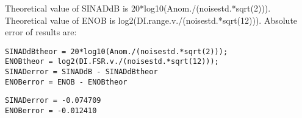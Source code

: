 Theoretical value of SINADdB is 20*log10(Anom./(noisestd.*sqrt(2))). Theoretical value of ENOB is
log2(DI.range.v./(noisestd.*sqrt(12))). Absolute error of results are:

\begin{lstlisting}
SINADdBtheor = 20*log10(Anom./(noisestd.*sqrt(2)));
ENOBtheor = log2(DI.FSR.v./(noisestd.*sqrt(12)));
SINADerror = SINADdB - SINADdBtheor
ENOBerror = ENOB - ENOBtheor
\end{lstlisting}
\begin{lstlisting}[language={},xleftmargin=5pt,frame=none]
SINADerror = -0.074709
ENOBerror = -0.012410

\end{lstlisting}


\stopcontents[localtoc]
